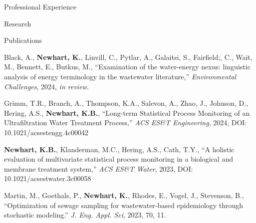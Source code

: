 \documentclass{resume} %
\begin{document}
\begin{rSection}{Professional Experience}
\begin{rSection}{Research}

\end{rSection}

\newpage


\begin{rSection}{Publications}
\begin{etaremune}

	\item Black, A.,  \textbf{Newhart, K.},  Linvill, C.,  Pytlar, A., Galaitsi, S.,  Fairfield;, C.,  Wait, M.,  Bennett, E.,  Butkus, M., ``Examination of the water-energy nexus: linguistic analysis of energy terminology in the wastewater literature,'' \emph{Environmental Challenges}, 2024, \emph{in review}.

	\item Grimm, T.R., Branch, A., Thompson, K.A., Salevon, A., Zhao, J., Johnson, D., Hering, A.S., \textbf{Newhart, K.B.}, ``Long-term Statistical Process Monitoring of an Ultrafiltration Water Treatment Process,'' \emph{ACS ES\&T Engineering}, 2024, DOI: 10.1021/acsestengg.4c00042


	\item \textbf{Newhart, K.B.}, Klanderman, M.C., Hering, A.S., Cath, T.Y., ``A holistic evaluation of multivariate statistical process monitoring in a biological and membrane treatment system,'' \emph{ACS ES\&T Water}, 2023, DOI: 10.1021/acsestwater.3c00058

	\item Martin, M., Goethals, P., \textbf{Newhart, K.}, Rhodes, E., Vogel, J., Stevenson, B., ``Optimization of sewage sampling for wastewater-based epidemiology through stochastic modeling.'' \emph{J. Eng. Appl. Sci}, 2023, 70, 11.


\end{etaremune}
\end{rSection}
\end{rSection}
\end{document}
